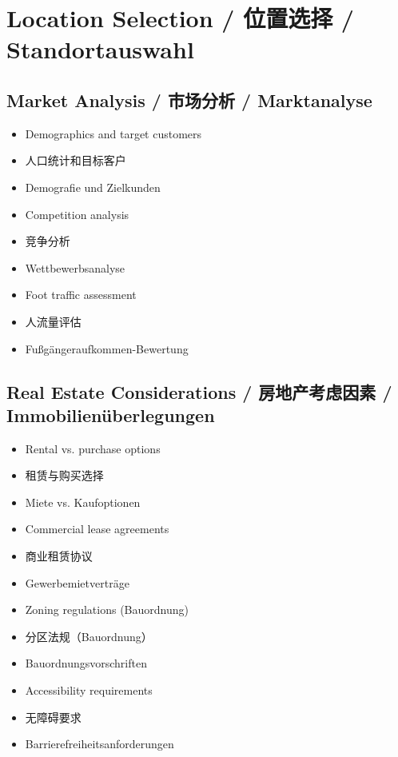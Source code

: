 \section{Location Selection / 位置选择 / Standortauswahl}

\subsection{Market Analysis / 市场分析 / Marktanalyse}
\begin{itemize}
    \item Demographics and target customers
    \item 人口统计和目标客户
    \item Demografie und Zielkunden
    \item Competition analysis
    \item 竞争分析
    \item Wettbewerbsanalyse
    \item Foot traffic assessment
    \item 人流量评估
    \item Fußgängeraufkommen-Bewertung
\end{itemize}

\subsection{Real Estate Considerations / 房地产考虑因素 / Immobilienüberlegungen}
\begin{itemize}
    \item Rental vs. purchase options
    \item 租赁与购买选择
    \item Miete vs. Kaufoptionen
    \item Commercial lease agreements
    \item 商业租赁协议
    \item Gewerbemietverträge
    \item Zoning regulations (Bauordnung)
    \item 分区法规（Bauordnung）
    \item Bauordnungsvorschriften
    \item Accessibility requirements
    \item 无障碍要求
    \item Barrierefreiheitsanforderungen
\end{itemize}

